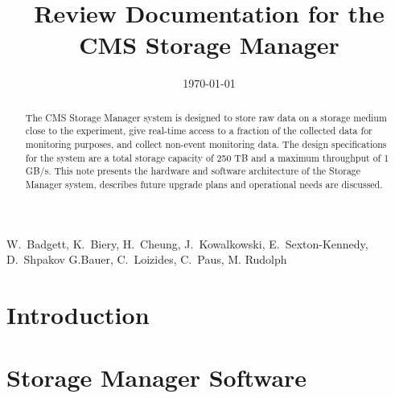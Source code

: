 \documentclass{cmspaper}
\begin{document}

\begin{titlepage}

   \date{\today}

  \title{Review Documentation for the\\ CMS Storage Manager}

  \begin{Authlist}
    W.~Badgett, K.~Biery, H.~Cheung, J.~Kowalkowski, 
    E.~Sexton-Kennedy, D.~Shpakov
    G.Bauer, C.~Loizides, C.~Paus, M. Rudolph 
  \end{Authlist}



  \begin{abstract}
The CMS Storage Manager system is designed to store raw data on a storage medium close to the
experiment, give real-time access to a fraction of the collected data for monitoring purposes, and
collect non-event monitoring data. The design specifications for the system are a total storage capacity
of 250 TB and a maximum throughput of 1 GB/s. This note presents the hardware and software
architecture of  the Storage Manager system, describes future upgrade plans and operational 
needs are discussed. 
  \end{abstract} 

  
\end{titlepage}

\setcounter{page}{2}%
\section{Introduction}    %


\section{Storage Manager Software}  %



\end{document}

